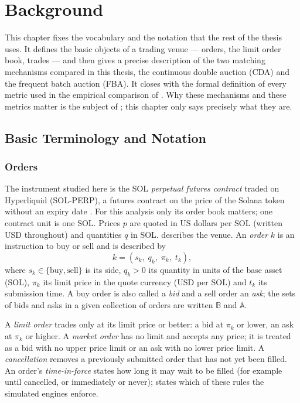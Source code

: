 \chapter{Background}
\label{ch:background}

This chapter fixes the vocabulary and the notation that the rest of the
thesis uses. It defines the basic objects of a trading venue --- orders,
the limit order book, trades --- and then gives a precise description of
the two matching mechanisms compared in this thesis, the continuous double
auction (CDA) and the frequent batch auction (FBA). It closes with the
formal definition of every metric used in the empirical comparison of
. Why these mechanisms and these metrics matter is the
subject of ; this chapter only says precisely what
they are.

\section{Basic Terminology and Notation}
\label{sec:terminology}

\subsection{Orders}

The instrument studied here is the SOL \emph{perpetual futures contract}
traded on Hyperliquid (SOL-PERP), a futures contract on the price of the
Solana token without an expiry date \citep{hyperliquid2026docs}. For this
analysis only its order book matters; one contract unit is one SOL. Prices $p$ are
quoted in US dollars per SOL (written USD throughout) and quantities $q$ in
SOL.  describes the venue. An \emph{order} $k$ is an
instruction to buy or sell and is described by
\begin{equation}
  k = (s_k,\; q_k,\; \pi_k,\; t_k),
\end{equation}
where $s_k \in \{\text{buy}, \text{sell}\}$ is its side, $q_k > 0$ its
quantity in units of the base asset (SOL), $\pi_k$ its limit price in the
quote currency (USD per SOL) and $t_k$ its submission time. A buy
order is also called a \emph{bid} and a sell order an \emph{ask}; the sets
of bids and asks in a given collection of orders are written $\mathbb{B}$
and $\mathbb{A}$.

A \emph{limit order} trades only at its limit price or better: a bid at
$\pi_k$ or lower, an ask at $\pi_k$ or higher. A \emph{market order} has no
limit and accepts any price; it is treated as a bid with no upper price
limit or an ask with no lower price limit. A \emph{cancellation} removes a
previously submitted order that has not yet been filled. An order's
\emph{time-in-force} states how long it may wait to be filled (for example
until cancelled, or immediately or never);  states
which of these rules the simulated engines enforce.


